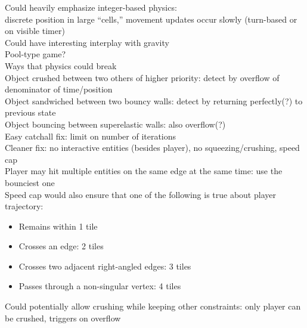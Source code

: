 \documentclass{article}
\begin{document}
Could heavily emphasize integer-based physics: \\
discrete position in large ``cells,''
movement updates occur slowly (turn-based or on visible timer) \\
Could have interesting interplay with gravity \\
Pool-type game? \\

Ways that physics could break \\
Object crushed between two others of higher priority:
detect by overflow of denominator of time/position \\
Object sandwiched between two bouncy walls:
detect by returning perfectly(?) to previous state \\
Object bouncing between superelastic walls: also overflow(?) \\
Easy catchall fix: limit on number of iterations \\
Cleaner fix: no interactive entities (besides player),
no squeezing/crushing, speed cap \\
Player may hit multiple entities on the same edge at the same time:
use the bounciest one \\
Speed cap would also ensure that one of the following is true
about player trajectory:
\begin{itemize}
\item
  Remains within 1 tile
\item
  Crosses an edge: 2 tiles
\item
  Crosses two adjacent right-angled edges: 3 tiles
\item
  Passes through a non-singular vertex: 4 tiles
\end{itemize}
Could potentially allow crushing while keeping other constraints:
only player can be crushed, triggers on overflow
\end{document}

